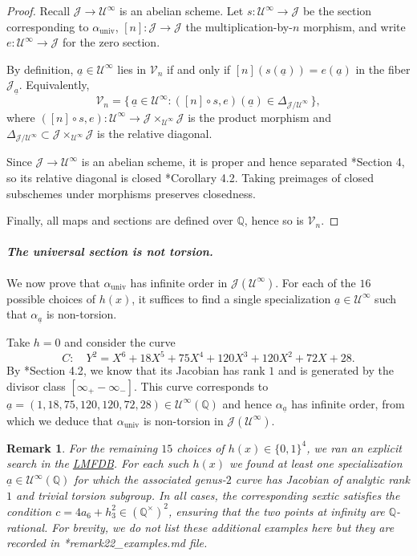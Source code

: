 \documentclass{amsart}
\newcommand{\Q}{{\mathbb Q}}
\newcommand{\cJ}{\mathcal{J}}
\newcommand{\cV}{\mathcal{V}}
\newcommand{\cU}{\mathcal{U}}
\newcommand{\ua}{\underline{a}}
\newtheorem{remark}[proposition]{Remark}
\begin{document}
\begin{proof}
Recall $\cJ\to\cU^\infty$ is an abelian scheme.  Let
$
  s:\cU^\infty \rightarrow \cJ
$
be the section corresponding to $\alpha_{\mathrm{univ}}$, $[n]:\cJ\to \cJ$ the
multiplication-by-$n$ morphism, and write
$
  e:\cU^\infty\rightarrow\mathcal J
$
for the zero section.

By definition, $\ua \in \cU^\infty$ lies in $\cV_n$ if and only if $[n](s(\ua))=e(\ua)$ in the fiber $\mathcal J_{\ua}$.
Equivalently,
\[
  \cV_n = \bigl\{\,\ua \in \cU^\infty : ([n]\circ s,e)(\ua)\in\Delta_{\mathcal J/\cU^\infty}\,\bigr\},
\]
where $([n]\circ s,e):\cU^\infty\to \mathcal J\times_{\cU^\infty}\mathcal J$ is the product morphism and
$\Delta_{\mathcal J/\cU^\infty}\subset \mathcal J\times_{\cU^\infty}\mathcal J$ is the relative diagonal. 

Since $\mathcal J\to \cU^\infty$ is an abelian scheme, it is proper and hence separated \cite{Hartshorne1977}*{Section 4}, so its relative diagonal is closed \cite{Hartshorne1977}*{Corollary 4.2}. Taking preimages of closed subschemes under morphisms preserves closedness.

Finally, all maps and
sections are defined over $\Q$, hence so is $\cV_n$.
\end{proof}

\medskip

\paragraph{\emph{The universal section is not torsion.}}

We now prove that $\alpha_{\mathrm{univ}}$ has infinite order in $\mathcal J(\cU^\infty)$. For each of the $16$ possible choices of $h(x)$,
it suffices to find a single specialization $\ua \in \cU^\infty$ such that $\alpha_{\ua}$ is non-torsion. 

Take $h=0$ and consider the curve
\begin{equation}\label{eq:tengely-curve}
  C :\quad Y^2 = X^6 + 18X^5 + 75X^4 + 120X^3 + 120X^2 + 72X + 28.
\end{equation}
By \cite{tengely_thesis}*{Section 4.2}, we know that its Jacobian has rank $1$ and is generated by the divisor
class $[\infty_+-\infty_-]$. This curve corresponds to $\ua = (1,18,75,120,120,72,28) \in \cU^{\infty}(\mathbb Q)$ and 
hence $\alpha_{\ua}$ has infinite order, from which we deduce that $\alpha_{\mathrm{univ}}$ is non-torsion in
$\mathcal J(\cU^\infty)$.

\begin{remark}
For the remaining $15$ choices of $h(x)\in\{0,1\}^4$, we ran an explicit search in the \href{https://www.lmfdb.org/Genus2Curve/Q/}{LMFDB}. For each such $h(x)$ we found at least one specialization
$\ua\in\cU^\infty(\Q)$ for which the associated genus-$2$ curve has Jacobian of analytic rank $1$
and trivial torsion subgroup.
In all cases, the corresponding sextic satisfies the condition
$c=4a_6+h_3^2\in(\Q^\times)^2$, ensuring that the two points at infinity are $\Q$-rational.
For brevity, we do not list these additional examples here but they are recorded in \cite{OnlineComplement}*{remark22\_examples.md file}.
\end{remark}
\end{document}
